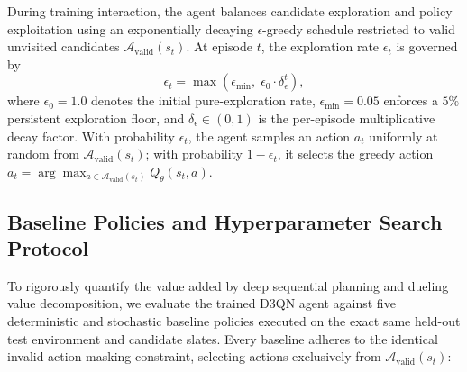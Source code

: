 During training interaction, the agent balances candidate exploration and policy exploitation using an exponentially decaying $\epsilon$-greedy schedule restricted to valid unvisited candidates $\mathcal{A}_{\text{valid}}(s_t)$. At episode $t$, the exploration rate $\epsilon_t$ is governed by
\begin{equation}
\label{eq:epsilon_schedule}
\epsilon_t = \max\!\left(\epsilon_{\min},\; \epsilon_0 \cdot \delta_\epsilon^t\right),
\end{equation}
where $\epsilon_0 = 1.0$ denotes the initial pure-exploration rate, $\epsilon_{\min} = 0.05$ enforces a $5\%$ persistent exploration floor, and $\delta_\epsilon \in (0, 1)$ is the per-episode multiplicative decay factor. With probability $\epsilon_t$, the agent samples an action $a_t$ uniformly at random from $\mathcal{A}_{\text{valid}}(s_t)$; with probability $1 - \epsilon_t$, it selects the greedy action $a_t = \arg\max_{a \in \mathcal{A}_{\text{valid}}(s_t)} Q_\theta(s_t, a)$.

\subsection{Baseline Policies and Hyperparameter Search Protocol}
\label{subsec:baselines_tuning}

To rigorously quantify the value added by deep sequential planning and dueling value decomposition, we evaluate the trained D3QN agent against five deterministic and stochastic baseline policies executed on the exact same held-out test environment and candidate slates. Every baseline adheres to the identical invalid-action masking constraint, selecting actions exclusively from $\mathcal{A}_{\text{valid}}(s_t)$:

